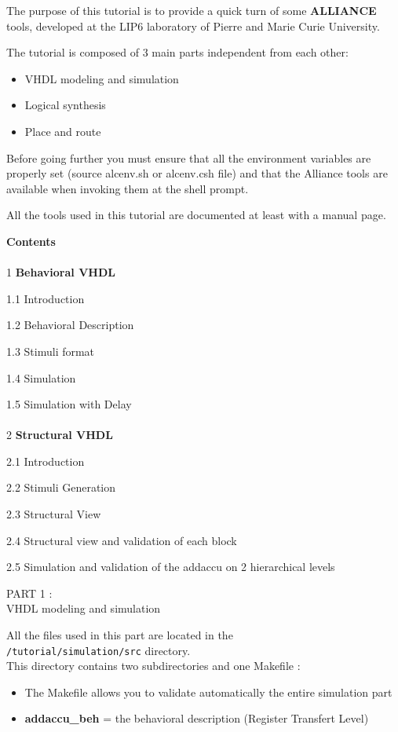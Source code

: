 \documentclass[12pt]{article}
\begin{document}
\newpage
\large{ The purpose of this tutorial is to provide a quick turn of some { \bf
ALLIANCE } tools, developed at the LIP6 laboratory of Pierre and Marie Curie
University.

The tutorial is composed of 3 main parts independent from each other:

\begin{itemize}\itemsep=-.8ex
\item {VHDL modeling and simulation}
\item {Logical synthesis}
\item {Place and route}
\end{itemize}

Before going further you must ensure that all the environment variables are
properly set (source alcenv.sh or alcenv.csh file)
and that the Alliance tools are available when invoking them at the shell
prompt.

All the tools used in this tutorial are documented at least with a
manual page.

\newpage
{\bf Contents}\\
\\
{1} {\bf Behavioral VHDL}

{1.1} Introduction

{1.2} Behavioral Description

{1.3} Stimuli format

{1.4} Simulation

{1.5} Simulation with Delay\\
\\
{2} {\bf Structural VHDL}

{2.1} Introduction

{2.2} Stimuli Generation

{2.3} Structural View

{2.4} Structural view and validation of each block

{2.5} Simulation and validation of the addaccu on 2 hierarchical levels

\newpage
        {\huge
        PART 1 :\\ }
        \vspace{1cm}
        {\huge
        VHDL modeling and simulation
        }

All the files used in this part are located in the \\ 
\texttt{/tutorial/simulation/src} directory.\\
This directory contains two subdirectories and one Makefile : 
\begin{itemize}
\item The Makefile allows you to validate automatically the entire simulation part
\item {\bf addaccu\_beh} = the behavioral description (Register Transfert Level)


\end{itemize}}
\end{document}
